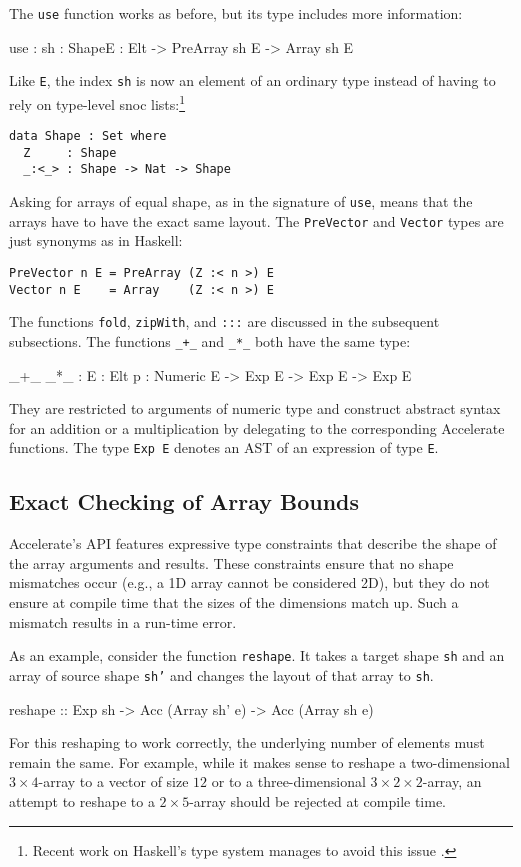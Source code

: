 \documentclass{llncs}
\begin{document}
The \texttt{use} function works as before, but its type
includes more information:
\begin{code}
use : {sh : Shape}{E : Elt} -> PreArray sh E -> Array sh E
\end{code}
Like \texttt{E}, the index \texttt{sh} is now an element of an
ordinary type instead of having to rely on type-level snoc
lists:\footnote{Recent work on Haskell's type system manages to avoid
  this issue \cite{YorgeyWeirichCretinJonesVytiniotisMagalhaes2012}.}
\begin{verbatim}
data Shape : Set where
  Z     : Shape
  _:<_> : Shape -> Nat -> Shape
\end{verbatim}
Asking for arrays of equal shape, as in the signature of \texttt{use},
means that the arrays have to have the exact same layout. The
\texttt{PreVector} and \texttt{Vector} types are just synonyms as in
Haskell:
\begin{verbatim}
PreVector n E = PreArray (Z :< n >) E
Vector n E    = Array    (Z :< n >) E
\end{verbatim}
The functions \texttt{fold}, \texttt{zipWith}, and \texttt{:::} are
discussed in the subsequent subsections. The functions \verb|_+_| and
\verb|_*_| both have the same type:
\begin{code}
_+_ _*_ : {E : Elt} {{p : Numeric E}} -> Exp E -> Exp E -> Exp E
\end{code}
They are restricted to arguments of numeric type and construct
abstract syntax for an addition or a multiplication by delegating to
the corresponding Accelerate functions. The type \texttt{Exp E}
denotes an AST of an expression of type \texttt{E}. 



\subsection{Exact Checking of Array Bounds}
\label{sec:exact-checking-array}

Accelerate's API features expressive type constraints that describe
the shape of the array arguments and results. These constraints ensure
that no shape mismatches occur (e.g., a 1D array cannot be
considered 2D), but they do not ensure at compile
time that the sizes of the dimensions match up. Such a mismatch
results in a run-time error.

As an example, consider the function \texttt{reshape}. 
It takes a target shape \texttt{sh} and an array of source shape
\texttt{sh'} and changes the layout of that array to \texttt{sh}. 
\begin{hcode}
reshape :: Exp sh -> Acc (Array sh' e) -> Acc (Array sh e)
\end{hcode}
For this reshaping to work correctly, the underlying
number of elements must remain the same. For example, while it makes sense
to reshape a two-dimensional $3\times 4$-array to a vector of size
$12$ or to a three-dimensional $3\times2\times2$-array, an attempt to
reshape to a $2\times5$-array should be rejected at
compile time.
\end{document}
